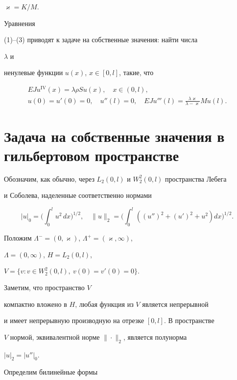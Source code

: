 $\varkappa=K/M$. 


Уравнения  


(1)--(3) приводят к задаче на собственные значения: найти числа 


$\lambda$ и 


ненулевые функции $u(x)$, $x\in[0,l]$, такие, что 


\begin{gather} 


E J u^{\mathrm{IV}}(x)=\lambda\rho S u(x),\quad x\in(0,l),\\ 


u(0)=u'(0)=0,\quad u''(l)=0,\quad 


E J u'''(l)=\frac{\lambda\varkappa}{\lambda-\varkappa}M u(l). 


\end{gather} 


 


\section{Задача на собственные значения в гильбертовом пространстве} 


 


Обозначим, как обычно, через $L_2(0,l)$ и $W^2_2(0,l)$ пространства Лебега  


и Соболева, наделенные соответственно нормами 


$$ 


|u|_0=\bigg(\int^l_0 u^2\,dx \bigg)^{1/2},\quad 


\|u\|_2=\bigg(\int^l_0((u'')^2+(u')^2+u^2)dx \bigg)^{1/2}. 


$$ 


Положим $\Lambda^-=(0,\varkappa)$, $\Lambda^+=(\varkappa,\infty)$, 


$\Lambda=(0,\infty)$, $H=L_2(0,l)$, 


$V=\{v:v\in W^2_2(0,l),\ v(0)=v'(0)=0\}$. 


Заметим, что пространство $V$  


компактно вложено в $H$, любая функция из $V$ является непрерывной  


и имеет непрерывную производную на отрезке $[0,l]$. В пространстве  


$V$ нормой, эквивалентной норме $\|\cdot\|_2$, является полунорма 


$|u|_2=|u''|_0$. 


Определим билинейные формы 


